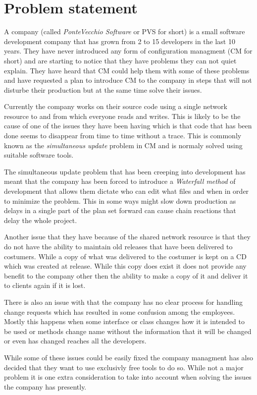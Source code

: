 \documentclass[a4paper]{article}
\begin{document}
\section{Problem statement}
A company (called \emph{PonteVecchio Software} or PVS for short) is a small software development company that has grown from 2 to 15 developers in the last 10 years. They have never introduced any form of configuration managment (CM for short) and are starting to notice that they have problems they can not quiet explain. They have heard that CM could help them with some of these problems and have requested a plan to introduce CM to the company in steps that will not disturbe their production but at the same time solve their issues.

Currently the company works on their source code using a single network resource to and from which everyone reads and writes. This is likely to be the cause of one of the issues they have been having which is that code that has been done seems to disappear from time to time without a trace. This is commonly known as the \emph{simultaneous update} problem in CM and is normaly solved using suitable software tools.

The simultaneous update problem that has been creeping into development has meant that the company has been forced to introduce a \emph{Waterfall method} of development that allows them dictate who can edit what files and when in order to minimize the problem. This in some ways might slow down production as delays in a single part of the plan set forward can cause chain reactions that delay the whole project.

Another issue that they have because of the shared network resource is that they do not have the ability to maintain old releases that have been delivered to costumers. While a copy of what was delivered to the costumer is kept on a CD which was created at release. While this copy does exist it does not provide any benefit to the company other then the ability to make a copy of it and deliver it to clients again if it is lost.

There is also an issue with that the company has no clear process for handling change requests which has resulted in some confusion among the employees. Mostly this happens when some interface or class changes how it is intended to be used or methods change name without the information that it will be changed or even has changed reaches all the developers.

While some of these issues could be easily fixed the company managment has also decided that they want to use exclusivly free tools to do so. While not a major problem it is one extra consideration to take into account when solving the issues the company has presently.
\end{document}
